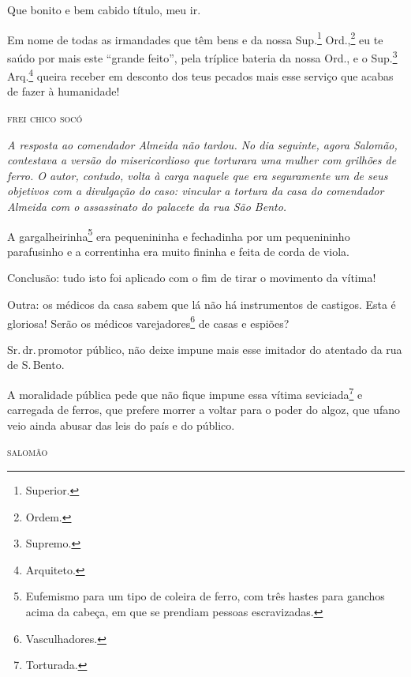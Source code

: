 Que bonito e bem cabido título, meu ir.

Em nome de todas as irmandades que têm bens e da nossa Sup.\footnote{
  Superior.} Ord.,\footnote{Ordem.} eu te saúdo por mais este ``grande
feito'', pela tríplice bateria da nossa Ord., e o Sup.\footnote{
  Supremo.} Arq.\footnote{Arquiteto.}
queira receber em desconto
dos teus pecados mais esse serviço que acabas de fazer à humanidade!

\medskip
\hfill\textsc{frei chico socó}


\begin{resumo}
\emph{A resposta ao comendador Almeida não tardou. No dia seguinte,
agora Salomão, contestava a versão do misericordioso que
torturara uma mulher com grilhões de ferro. O autor, contudo, volta à carga naquele que era seguramente um
de seus objetivos com a divulgação do caso: vincular a tortura da casa
do comendador Almeida com o assassinato do palacete da rua São Bento. }
\end{resumo}

A gargalheirinha\footnote{Eufemismo para um tipo de coleira de ferro,
  com três hastes para ganchos acima da cabeça, em que se prendiam
  pessoas escravizadas.} era pequenininha e fechadinha por um
pequenininho parafusinho e a correntinha era muito fininha e feita de
corda de viola.

Conclusão: tudo isto foi aplicado com o fim de tirar o movimento da
vítima!

Outra: os médicos da casa sabem que lá não há instrumentos de castigos.
Esta é gloriosa! Serão os médicos varejadores\footnote{Vasculhadores.}
de casas e espiões?

Sr.\,dr.\,promotor público, não deixe impune mais esse imitador do
atentado da rua de S.\,Bento.

A moralidade pública pede que não fique impune essa vítima
seviciada\footnote{Torturada.}
e carregada de ferros, que
prefere morrer a voltar para o poder do algoz, que ufano veio ainda
abusar das leis do país e do público.

\hfill\textsc{salomão}

